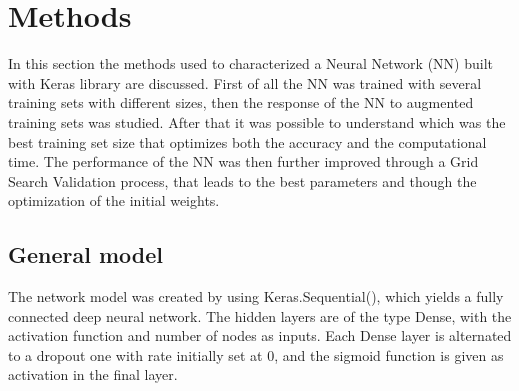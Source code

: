 \documentclass[prl,twocolumn]{revtex4-1}
\begin{document}
 \section{Methods}
In this section the methods used to characterized a Neural Network (NN) built with Keras library are discussed. First of all the NN was trained with several training sets with different sizes, then the response of the NN to augmented training sets was studied. 
After that it was possible to understand which was the best training set size that optimizes both the accuracy and the computational time. The performance of the NN was then further improved through a Grid Search Validation process, that leads to the best parameters and though the optimization of the initial weights.
\subsection{General model}
The network model was created by using Keras.Sequential(), which yields a fully connected deep neural network. The hidden layers are of the type Dense, with the activation function and number of nodes as inputs. Each Dense layer is alternated to a dropout one with rate initially set at 0, and the sigmoid function is given as activation in the final layer. 

\end{document}
